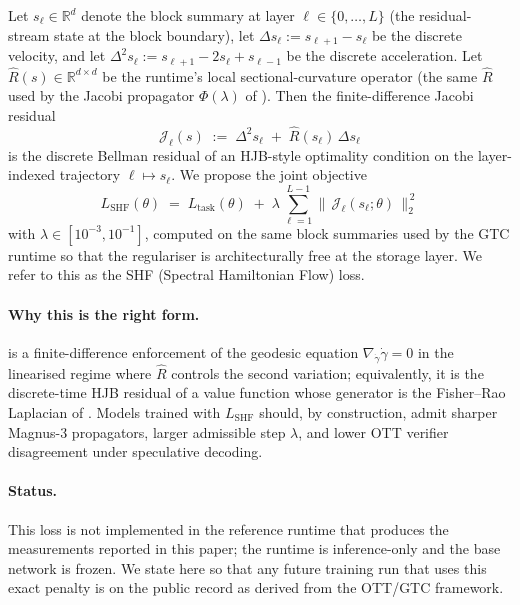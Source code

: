 \documentclass[11pt]{article}
\begin{document}
Let $s_\ell\in\mathbb{R}^{d}$ denote the block summary at layer
$\ell\in\{0,\dots,L\}$ (the residual-stream state at the block boundary),
let $\Delta s_\ell := s_{\ell+1}-s_\ell$ be the discrete velocity, and
let $\Delta^2 s_\ell := s_{\ell+1}-2s_\ell+s_{\ell-1}$ be the discrete
acceleration.  Let $\hat R(s)\in\mathbb{R}^{d\times d}$ be the runtime's
local sectional-curvature operator (the same $\hat R$ used by the Jacobi
propagator $\Phi(\lambda)$ of ).  Then the
finite-difference Jacobi residual
\begin{equation}
\mathcal{J}_\ell(s) \;:=\; \Delta^2 s_\ell \;+\; \hat R(s_\ell)\,\Delta s_\ell
\label{eq:jacobi-residual}
\end{equation}
is the discrete Bellman residual of an HJB-style optimality condition on
the layer-indexed trajectory $\ell\mapsto s_\ell$.  We propose the joint
objective
\begin{equation}
\boxed{\;
L_{\mathrm{SHF}}(\theta)
\;=\;
L_{\mathrm{task}}(\theta)
\;+\;
\lambda\,\sum_{\ell=1}^{L-1}
\bigl\|\,\mathcal{J}_\ell(s_\ell;\theta)\,\bigr\|_2^{\,2}
\;}
\label{eq:hjb-loss}
\end{equation}
with $\lambda\in[10^{-3},10^{-1}]$, computed on the same block summaries
used by the GTC runtime so that the regulariser is
architecturally free at the storage layer.  We refer to this as
the SHF (Spectral Hamiltonian Flow) loss.

\paragraph{Why this is the right form.}
 is a finite-difference enforcement of the geodesic
equation $\nabla_{\dot\gamma}\dot\gamma=0$ in the linearised regime where
$\hat R$ controls the second variation; equivalently, it is the
discrete-time HJB residual of a value function whose generator is the
Fisher--Rao Laplacian of .  Models trained
with $L_{\mathrm{SHF}}$ should, by construction, admit
sharper Magnus-3 propagators, larger admissible step $\lambda$, and
lower OTT verifier disagreement under speculative decoding.

\paragraph{Status.}
This loss is not implemented in the reference runtime that
produces the measurements reported in this paper; the runtime is
inference-only and the base network is frozen.  We state
 here so that any future training run that uses this
exact penalty is on the public record as derived from the OTT/GTC
framework.
\end{document}
